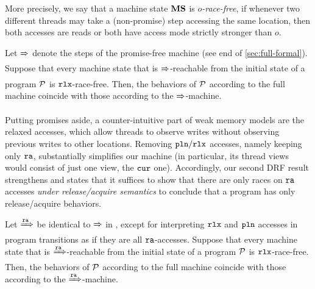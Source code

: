 More precisely, we say that a machine state ${\mathbf{MS}}$ is \emph{$o$-race-free},
if whenever two different threads may take a (non-promise) step accessing the same location,
then both accesses are reads or both have access mode strictly stronger than $o$.

\begin{theorem}
\label{thm:drfpf}
Let $\xRightarrow{}$ denote the steps of the promise-free machine 
(see end of \ref{sec:full-formal}).
Suppose that every machine state that is $\xRightarrow{}$-reachable from the initial state of a program $\mathcal{P}$ is $\texttt{rlx}$-race-free.
Then, the behaviors of $\mathcal{P}$ according to the full machine 
coincide with those according to the $\xRightarrow{}$-machine.
\end{theorem}

Putting promises aside, a counter-intuitive part of weak memory models are the relaxed accesses,
which allow threads to observe writes without observing previous writes to other locations.
Removing $\texttt{pln}/\texttt{rlx}$ accesses, namely keeping only $\texttt{ra}$, %
substantially simplifies our machine (in particular, 
its thread views would consist of just one view, the ${\texttt{cur}}$ one).
Accordingly, our second DRF result strengthens 
and states that it suffices to show
that there are only races on $\texttt{ra}$ %
accesses \emph{under release/acquire semantics} 
to conclude that a program has only release/acquire behaviors.

\begin{theorem}[DRF-RA]
\label{thm:drfra}
Let $\xRightarrow{\texttt{ra}}$ be identical to $\xRightarrow{}$ in , except for interpreting 
$\texttt{rlx}$ and $\texttt{pln}$ accesses in program transitions as if they are all $\texttt{ra}$-accesses.
Suppose that every machine state that is $\xRightarrow{\texttt{ra}}$-reachable from the initial state of a program $\mathcal{P}$ is $\texttt{rlx}$-race-free.
Then, the behaviors of $\mathcal{P}$ according to the full machine 
coincide with those according to the $\xRightarrow{\texttt{ra}}$-machine.
\end{theorem}


